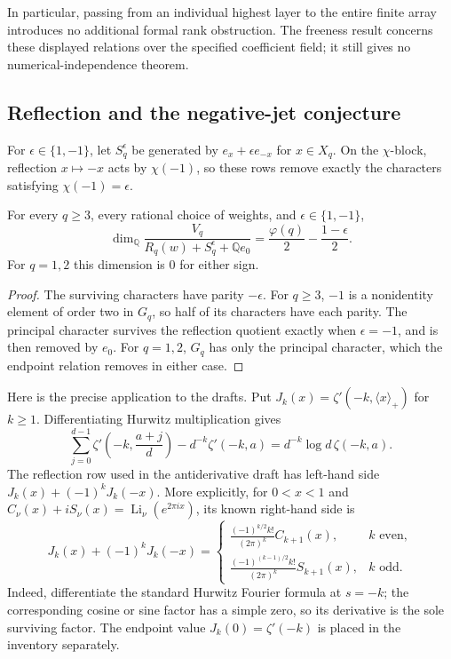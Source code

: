 In particular, passing from an individual highest layer to the entire
finite array introduces no additional formal rank obstruction.  The
freeness result concerns these displayed relations over the specified
coefficient field; it still gives no numerical-independence theorem.

\subsection{Reflection and the negative-jet conjecture}

For $\epsilon\in\{1,-1\}$, let $S_q^\epsilon$ be generated by
$e_x+\epsilon e_{-x}$ for $x\in X_q$.  On the $\chi$-block, reflection
$x\mapsto-x$ acts by $\chi(-1)$, so these rows remove exactly the
characters satisfying $\chi(-1)=\epsilon$.

\begin{corollary}\label{rank:reflection}
For every $q\geq3$, every rational choice of weights, and
$\epsilon\in\{1,-1\}$,
\begin{equation}\label{rank:reflection-dimension}
 \dim_{\mathbb Q}
 \frac{V_q}{R_q(w)+S_q^\epsilon+\mathbb Q e_0}
 =\frac{\varphi(q)}2-\frac{1-\epsilon}{2}.
\end{equation}
For $q=1,2$ this dimension is $0$ for either sign.
\end{corollary}
\begin{proof}
The surviving characters have parity $-\epsilon$.  For $q\geq3$,
$-1$ is a nonidentity element of order two in $G_q$, so half of its
characters have each parity.  The principal character survives the
reflection quotient exactly when $\epsilon=-1$, and is then removed
by $e_0$.  For $q=1,2$, $G_q$ has only the principal character, which
the endpoint relation removes in either case.
\end{proof}

Here is the precise application to the drafts.  Put
$J_k(x)=\zeta'(-k,\langle x\rangle_+)$ for $k\geq1$.  Differentiating
Hurwitz multiplication gives
\begin{equation}\label{rank:jet-distribution}
 \sum_{j=0}^{d-1}\zeta'\left(-k,\frac{a+j}{d}\right)
 -d^{-k}\zeta'(-k,a)
 =d^{-k}\log d\,\zeta(-k,a).
\end{equation}
The reflection row used in the antiderivative draft has left-hand side
$J_k(x)+(-1)^kJ_k(-x)$.  More explicitly, for $0<x<1$ and
$C_\nu(x)+iS_\nu(x)=\operatorname{Li}_{\nu}(e^{2\pi i x})$, its known
right-hand side is
\begin{equation}\label{rank:jet-reflection}
 J_k(x)+(-1)^kJ_k(-x)
 =\begin{cases}
  \displaystyle\frac{(-1)^{k/2}k!}{(2\pi)^k}C_{k+1}(x),&k\text{ even},\\[6pt]
  \displaystyle\frac{(-1)^{(k-1)/2}k!}{(2\pi)^k}S_{k+1}(x),&k\text{ odd}.
 \end{cases}
\end{equation}
Indeed, differentiate the standard Hurwitz Fourier formula at $s=-k$;
the corresponding cosine or sine factor has a simple zero, so its
derivative is the sole surviving factor.  The endpoint value
$J_k(0)=\zeta'(-k)$ is placed in the inventory separately.

